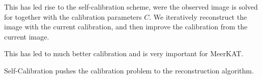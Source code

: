This has led rise to the self-calibration scheme, were the observed image is solved for together with the calibration parameters $C$. We iteratively reconstruct the image with the current calibration, and then improve the calibration from the current image.

This has led to much better calibration and is very important for MeerKAT.

Self-Calibration pushes the calibration problem to the reconstruction algorithm.






